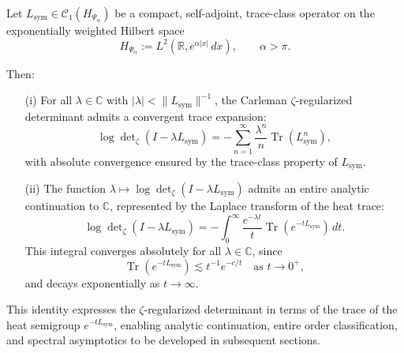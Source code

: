 \begin{lemma}
\label{lem:det-via-heat-trace}
Let \( L_{\mathrm{sym}} \in \mathcal{C}_1(H_{\Psi_\alpha}) \) be a compact, self-adjoint, trace-class operator on the exponentially weighted Hilbert space
\[
H_{\Psi_\alpha} := L^2(\mathbb{R}, e^{\alpha|x|} \, dx), \qquad \alpha > \pi.
\]

Then:
\begin{enumerate}
  \item[\textnormal{(i)}] For all \( \lambda \in \mathbb{C} \) with \( |\lambda| < \|L_{\mathrm{sym}}\|^{-1} \), the Carleman \(\zeta\)-regularized determinant admits a convergent trace expansion:
  \[
  \log \det\nolimits_{\zeta}(I - \lambda L_{\mathrm{sym}})
  = - \sum_{n=1}^\infty \frac{\lambda^n}{n} \operatorname{Tr}(L_{\mathrm{sym}}^n),
  \]
  with absolute convergence ensured by the trace-class property of \( L_{\mathrm{sym}} \).

  \item[\textnormal{(ii)}] The function \( \lambda \mapsto \log \det\nolimits_\zeta(I - \lambda L_{\mathrm{sym}}) \) admits an entire analytic continuation to \( \mathbb{C} \), represented by the Laplace transform of the heat trace:
  \[
  \log \det\nolimits_\zeta(I - \lambda L_{\mathrm{sym}})
  = - \int_0^\infty \frac{e^{-\lambda t}}{t} \operatorname{Tr}(e^{-t L_{\mathrm{sym}}}) \, dt.
  \]
  This integral converges absolutely for all \( \lambda \in \mathbb{C} \), since
  \[
  \operatorname{Tr}(e^{-t L_{\mathrm{sym}}}) \lesssim t^{-1} e^{-c/t}
  \quad \text{as } t \to 0^+,
  \]
  and decays exponentially as \( t \to \infty \).
\end{enumerate}

\medskip
\noindent
This identity expresses the \(\zeta\)-regularized determinant in terms of the trace of the heat semigroup \( e^{-t L_{\mathrm{sym}}} \), enabling analytic continuation, entire order classification, and spectral asymptotics to be developed in subsequent sections.
\end{lemma}
% 